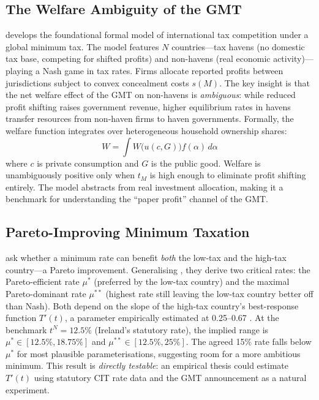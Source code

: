 \documentclass[11pt,a4paper]{article}
\begin{document}
\subsection{The Welfare Ambiguity of the GMT}
\label{subsec:johannesen}

\citet{Johannesen2022} develops the foundational formal model of international tax competition under a global minimum tax. The model features $N$ countries---tax havens (no domestic tax base, competing for shifted profits) and non-havens (real economic activity)---playing a Nash game in tax rates. Firms allocate reported profits between jurisdictions subject to convex concealment costs $s(M)$. The key insight is that the net welfare effect of the GMT on non-havens is \emph{ambiguous}: while reduced profit shifting raises government revenue, higher equilibrium rates in havens transfer resources from non-haven firms to haven governments. Formally, the welfare function integrates over heterogeneous household ownership shares:
\begin{equation}
W = \int W\bigl(u(c,G)\bigr) f(\alpha)\, d\alpha
\end{equation}
where $c$ is private consumption and $G$ is the public good. Welfare is unambiguously positive only when $t_M$ is high enough to eliminate profit shifting entirely. The model abstracts from real investment allocation, making it a benchmark for understanding the ``paper profit'' channel of the GMT.

\subsection{Pareto-Improving Minimum Taxation}
\label{subsec:hebous}

\citet{hebous2023} ask whether a minimum rate can benefit \emph{both} the low-tax and the high-tax country---a Pareto improvement. Generalising \citet{Johannesen2022}, they derive two critical rates: the Pareto-efficient rate $\mu^*$ (preferred by the low-tax country) and the maximal Pareto-dominant rate $\mu^{**}$ (highest rate still leaving the low-tax country better off than Nash). Both depend on the slope of the high-tax country's best-response function $T'(t)$, a parameter empirically estimated at 0.25--0.67 \citep{hebous2023}. At the benchmark $t^N = 12.5\%$ (Ireland's statutory rate), the implied range is $\mu^* \in [12.5\%, 18.75\%]$ and $\mu^{**} \in [12.5\%, 25\%]$. The agreed 15\% rate falls below $\mu^*$ for most plausible parameterisations, suggesting room for a more ambitious minimum. This result is \emph{directly testable}: an empirical thesis could estimate $T'(t)$ using statutory CIT rate data and the GMT announcement as a natural experiment.
\end{document}
